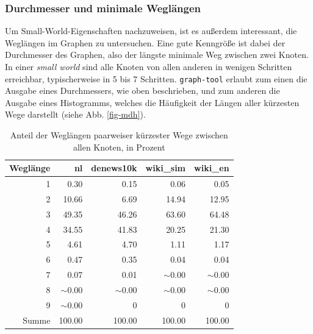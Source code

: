 \documentclass[11pt, a4paper]{article}
\begin{document}
\subsubsection{Durchmesser und minimale Wegl\"angen}
Um Small-World-Eigenschaften nachzuweisen, ist es außerdem interessant, die
Weglängen im Graphen zu untersuchen. Eine gute Kenngröße ist dabei der Durchmesser
des Graphen, also der längste minimale Weg zwischen zwei Knoten. In einer
\emph{small world} sind alle Knoten von allen anderen in wenigen Schritten
erreichbar, typischerweise in 5 bis 7 Schritten. \texttt{graph-tool}
erlaubt zum einen die Ausgabe eines Durchmessers, wie oben beschrieben, und zum
anderen die Ausgabe eines Histogramms, welches die Häufigkeit der Längen aller
kürzesten Wege darstellt (siehe Abb. \ref{fig-mdh}).

\begin{table}[ht]
    \centering
    \begin{tabular}{rrrrr}
      \toprule
    Weglänge & nl & denews10k & wiki\_sim & wiki\_en \\ 
      \midrule
      1 & 0.30      & 0.15      & 0.06      & 0.05 \\ 
      2 & 10.66     & 6.69      & 14.94     & 12.95 \\ 
      3 & 49.35     & 46.26     & 63.60     & 64.48 \\ 
      4 & 34.55     & 41.83     & 20.25     & 21.30 \\ 
      5 & 4.61      & 4.70      & 1.11      & 1.17 \\ 
      6 & 0.47      & 0.35      & 0.04      & 0.04 \\ 
      7 & 0.07      & 0.01      & $\sim$0.00  & $\sim$0.00 \\ 
      8 & $\sim$0.00  & $\sim$0.00  & $\sim$0.00  & $\sim$0.00 \\ 
      9 & $\sim$0.00  & 0         & 0         & 0 \\ 
      Summe & 100.00  & 100.00    & 100.00    & 100.00 \\ 
       \bottomrule
    \end{tabular}
    \caption{Anteil der Weglängen paarweiser kürzester Wege zwischen allen Knoten, in Prozent}
    \label{md-perc}
\end{table}


\end{document}
